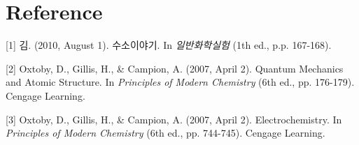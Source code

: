 \documentclass[%
 reprint,
 amsmath,amssymb,
 aps,
]{revtex4-2}
\begin{document}
\section{\label{sec:level1}Reference}
[1] 김. (2010, August 1). 수소이야기. In \textit{일반화학실험} (1th ed., p.p. 167-168).

[2] Oxtoby, D., Gillis, H., \& Campion, A. (2007, April 2). Quantum Mechanics and Atomic Structure. In \textit{Principles of Modern Chemistry} (6th ed., pp. 176-179). Cengage Learning.

[3] Oxtoby, D., Gillis, H., \& Campion, A. (2007, April 2). Electrochemistry. In \textit{Principles of Modern Chemistry} (6th ed., pp. 744-745). Cengage Learning.
\end{document}
